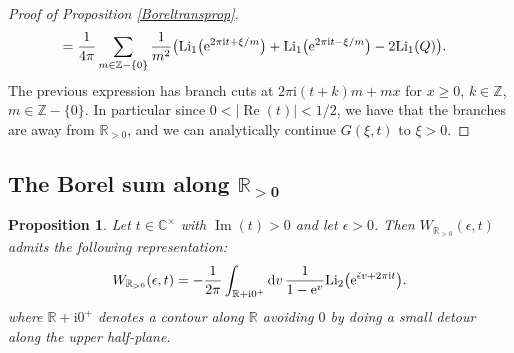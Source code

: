\documentclass[pdftex]{sigma}
\numberwithin{equation}{section}
\newtheorem{Proposition}[Theorem]{Proposition}
 { \theoremstyle{definition}
\newtheorem{Definition}[Theorem]{Definition}
\newtheorem{Note}[Theorem]{Note}
\newtheorem{Example}[Theorem]{Example}
\newtheorem{Remark}[Theorem]{Remark} }
\begin{document}
\begin{proof}[Proof of Proposition \ref{Boreltransprop}]
\begin{align*}
 &=\frac{1}{4\pi}\sum_{m\in \mathbb{Z}-\{0\}} \frac{1}{m^2}\big(\mathrm{Li}_1\big({\rm e}^{2\pi \mathrm{i} t + \xi/m}\big)+\mathrm{Li}_1\big({\rm e}^{2\pi \mathrm{i} t - \xi/m}\big)-2\mathrm{Li}_1(Q)\big).
\end{align*}
The previous expression has branch cuts at $2\pi \mathrm{i}(t+k)m +mx$ for $x\geq 0$, $k\in \mathbb{Z}$, $m\in \mathbb{Z}-\{0\}$. In particular since $0<|\operatorname{Re}(t)|<1/2$, we have that the branches are away from $\mathbb{R}_{>0}$, and we can analytically continue $G(\xi,t)$ to $\xi>0$.
\end{proof}

\subsection[The Borel sum along $\mathbb{R}_{>0}$]{The Borel sum along $\boldsymbol{\mathbb{R}_{>0}}$}\label{BorelsumRapp}
\begin{Proposition}\label{WorformBorelsum}
Let $t\in \mathbb{C}^{\times}$ with $\operatorname{Im}(t)>0$ and let $\epsilon >0$. Then $W_{\mathbb{R}_{>0}}(\epsilon,t)$
admits the following representation:
\begin{equation}\label{altform2}
 W_{\mathbb{R}_{>0}}(\epsilon,t)=-\frac{1}{2\pi}\int_{\mathbb{R}+\mathrm{i}0^+}{\rm d}v\, \frac{1}{1-{\rm e}^v}\mathrm{Li}_2\big({\rm e}^{\check\epsilon v +2\pi \mathrm{i} t}\big).
\end{equation}
where $\mathbb{R}+\mathrm{i}0^+$ denotes a contour along $\mathbb{R}$ avoiding $0$ by doing a small detour along the upper half-plane.
\end{Proposition}
\end{document}
